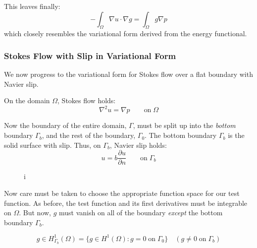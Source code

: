 \documentclass[12pt, a4paper, twoside, openright]{book}
\begin{document}
This leaves finally:
\begin{equation}
- \int_{\Omega} \nabla u \cdot \nabla g  
= \int_{\Omega} g \nabla p
\end{equation}
which closely resembles the variational form derived from the energy functional.


\subsubsection*{Stokes Flow with Slip in Variational Form}

We now progress to the variational form for Stokes flow over a flat boundary with Navier slip.

On the domain $\Omega$, Stokes flow holds:
\begin{equation}
\nabla^2 u = \nabla p \qquad \text{on} \; \Omega
\end{equation}

Now the boundary of the entire domain, $\Gamma$, must be split up into the \emph{bottom} boundary $\Gamma_b$, and the rest of the boundary, $\Gamma_0$.  The bottom boundary $\Gamma_b$ is the solid surface with slip.  Thus, on $\Gamma_b$, Navier slip holds:
\begin{equation}
u = b \frac{\partial u}{\partial n} \qquad \text{on} \; \Gamma_b
\end{equation}

\vspace{1em}
\begin{figure}[ht]
\centering
{}
\caption{i}\label{i}
\end{figure}



Now care must be taken to choose the appropriate function space for our test function.  As before, the  test function and its first derivatives must be integrable on $\Omega$.  
But now, $g$ must vanish on all of the boundary \emph{except} the bottom boundary $\Gamma_b$.

\begin{equation}
g \in H^1_{\Gamma_b} (\Omega) = \lbrace g \in H^1(\Omega): g = 0 \; \text{on}\; \Gamma_0 \rbrace 
\quad (g \neq 0 \; \text{on} \; \Gamma_b)
\end{equation}
\end{document}
